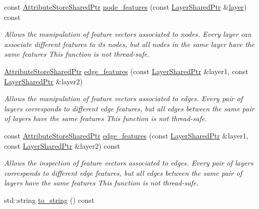 \begin{DoxyCompactItemize}
const \hyperlink{namespacemlnet_a3d60b9ef6ef6489d000f6061e0a1bdf2}{Attribute\+Store\+Shared\+Ptr} \hyperlink{classmlnet_1_1_m_l_network_ab7b28f55476dd9209383ab68d40ff44e}{node\+\_\+features} (const \hyperlink{namespacemlnet_a10c007fb811c55339dd5b9d32bb0505d}{Layer\+Shared\+Ptr} \&\hyperlink{classmlnet_1_1layer}{layer}) const 
\begin{DoxyCompactList}\small\item\em Allows the manipulation of feature vectors associated to nodes. Every layer can associate different features to its nodes, but all nodes in the same layer have the same features This function is not thread-\/safe. \end{DoxyCompactList}\item 
\hyperlink{namespacemlnet_a3d60b9ef6ef6489d000f6061e0a1bdf2}{Attribute\+Store\+Shared\+Ptr} \hyperlink{classmlnet_1_1_m_l_network_a7a72f3e23c9a098fda3e7ef0947f4db9}{edge\+\_\+features} (const \hyperlink{namespacemlnet_a10c007fb811c55339dd5b9d32bb0505d}{Layer\+Shared\+Ptr} \&layer1, const \hyperlink{namespacemlnet_a10c007fb811c55339dd5b9d32bb0505d}{Layer\+Shared\+Ptr} \&layer2)
\begin{DoxyCompactList}\small\item\em Allows the manipulation of feature vectors associated to edges. Every pair of layers corresponds to different edge features, but all edges between the same pair of layers have the same features This function is not thread-\/safe. \end{DoxyCompactList}\item 
const \hyperlink{namespacemlnet_a3d60b9ef6ef6489d000f6061e0a1bdf2}{Attribute\+Store\+Shared\+Ptr} \hyperlink{classmlnet_1_1_m_l_network_acf22ca4a335edf9a68f8304cfb681dcf}{edge\+\_\+features} (const \hyperlink{namespacemlnet_a10c007fb811c55339dd5b9d32bb0505d}{Layer\+Shared\+Ptr} \&layer1, const \hyperlink{namespacemlnet_a10c007fb811c55339dd5b9d32bb0505d}{Layer\+Shared\+Ptr} \&layer2) const 
\begin{DoxyCompactList}\small\item\em Allows the inspection of feature vectors associated to edges. Every pair of layers corresponds to different edge features, but all edges between the same pair of layers have the same features This function is not thread-\/safe. \end{DoxyCompactList}\item 
std\+::string \hyperlink{classmlnet_1_1_m_l_network_aad18a3068440db5d63b4e621749f8812}{to\+\_\+string} () const 
\end{DoxyCompactItemize}
